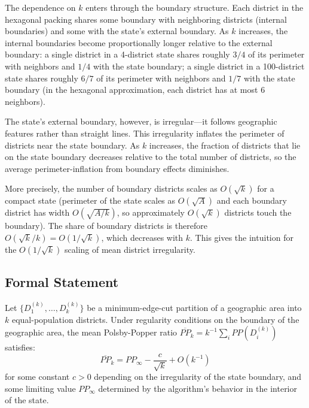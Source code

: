The dependence on $k$ enters through the boundary structure. Each district in the hexagonal packing shares some boundary with neighboring districts (internal boundaries) and some with the state's external boundary. As $k$ increases, the internal boundaries become proportionally longer relative to the external boundary: a single district in a 4-district state shares roughly $3/4$ of its perimeter with neighbors and $1/4$ with the state boundary; a single district in a 100-district state shares roughly $6/7$ of its perimeter with neighbors and $1/7$ with the state boundary (in the hexagonal approximation, each district has at most 6 neighbors).

The state's external boundary, however, is irregular---it follows geographic features rather than straight lines. This irregularity inflates the perimeter of districts near the state boundary. As $k$ increases, the fraction of districts that lie on the state boundary decreases relative to the total number of districts, so the average perimeter-inflation from boundary effects diminishes.

More precisely, the number of boundary districts scales as $O(\sqrt{k})$ for a compact state (perimeter of the state scales as $O(\sqrt{A})$ and each boundary district has width $O(\sqrt{A/k})$, so approximately $O(\sqrt{k})$ districts touch the boundary). The share of boundary districts is therefore $O(\sqrt{k}/k) = O(1/\sqrt{k})$, which decreases with $k$. This gives the intuition for the $O(1/\sqrt{k})$ scaling of mean district irregularity.

\subsection{Formal Statement}

\begin{proposition}
Let $\{D_1^{(k)}, \ldots, D_k^{(k)}\}$ be a minimum-edge-cut partition of a geographic area into $k$ equal-population districts. Under regularity conditions on the boundary of the geographic area, the mean Polsby-Popper ratio $\overline{PP}_k = k^{-1}\sum_i PP(D_i^{(k)})$ satisfies:
\begin{equation}
  \overline{PP}_k = PP_\infty - \frac{c}{\sqrt{k}} + O(k^{-1})
  \label{eq:scaling}
\end{equation}
for some constant $c > 0$ depending on the irregularity of the state boundary, and some limiting value $PP_\infty$ determined by the algorithm's behavior in the interior of the state.
\end{proposition}

